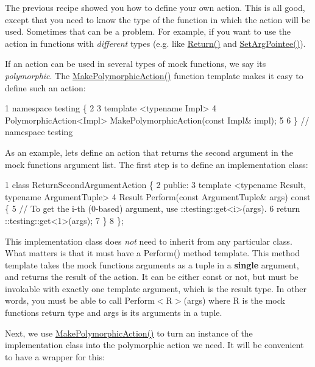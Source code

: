 The previous recipe showed you how to define your own action. This is all good, except that you need to know the type of the function in which the action will be used. Sometimes that can be a problem. For example, if you want to use the action in functions with {\itshape different} types (e.\+g. like {\ttfamily \hyperlink{namespacetesting_af6d1c13e9376c77671e37545cd84359c}{Return()}} and {\ttfamily \hyperlink{namespacetesting_a5740a5033b88c37666fcd09a269d123f}{Set\+Arg\+Pointee()}}).

If an action can be used in several types of mock functions, we say it\textquotesingle{}s {\itshape polymorphic}. The {\ttfamily \hyperlink{namespacetesting_a36bd06c5ea972c6df0bd9f40a7a94c65}{Make\+Polymorphic\+Action()}} function template makes it easy to define such an action\+:


\begin{DoxyCode}
1 namespace testing \{
2 
3 template <typename Impl>
4 PolymorphicAction<Impl> MakePolymorphicAction(const Impl& impl);
5 
6 \}  // namespace testing
\end{DoxyCode}


As an example, let\textquotesingle{}s define an action that returns the second argument in the mock function\textquotesingle{}s argument list. The first step is to define an implementation class\+:


\begin{DoxyCode}
1 class ReturnSecondArgumentAction \{
2  public:
3   template <typename Result, typename ArgumentTuple>
4   Result Perform(const ArgumentTuple& args) const \{
5     // To get the i-th (0-based) argument, use ::testing::get<i>(args).
6     return ::testing::get<1>(args);
7   \}
8 \};
\end{DoxyCode}


This implementation class does {\itshape not} need to inherit from any particular class. What matters is that it must have a {\ttfamily Perform()} method template. This method template takes the mock function\textquotesingle{}s arguments as a tuple in a {\bfseries single} argument, and returns the result of the action. It can be either {\ttfamily const} or not, but must be invokable with exactly one template argument, which is the result type. In other words, you must be able to call {\ttfamily Perform$<$R$>$(args)} where {\ttfamily R} is the mock function\textquotesingle{}s return type and {\ttfamily args} is its arguments in a tuple.

Next, we use {\ttfamily \hyperlink{namespacetesting_a36bd06c5ea972c6df0bd9f40a7a94c65}{Make\+Polymorphic\+Action()}} to turn an instance of the implementation class into the polymorphic action we need. It will be convenient to have a wrapper for this\+:


